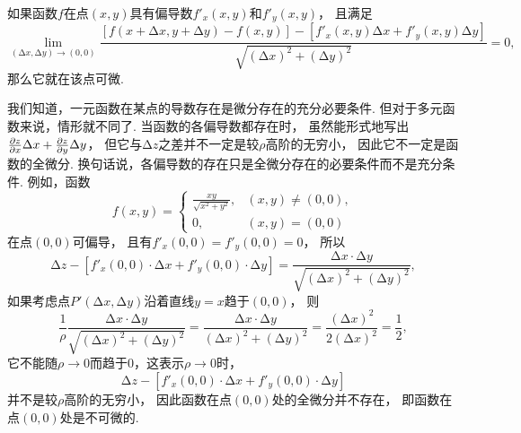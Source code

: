 \begin{theorem}\label{theorem:多元函数微分法.二元函数可微的充分必要条件}
如果函数\(f\)在点\((x,y)\)具有偏导数\(f'_x(x,y)\)和\(f'_y(x,y)\)，
且满足\[
	\lim_{(\increment x,\increment y)\to(0,0)}
	\frac{
		[f(x+\increment x,y+\increment y)-f(x,y)]
		-[f'_x(x,y) \increment x + f'_y(x,y) \increment y]
	}{
		\sqrt{(\increment x)^2+(\increment y)^2}
	} = 0,
\]那么它就在该点可微.
\end{theorem}

我们知道，一元函数在某点的导数存在是微分存在的充分必要条件.
但对于多元函数来说，情形就不同了.
当函数的各偏导数都存在时，
虽然能形式地写出\(\pdv{z}{x} \Delta x + \pdv{z}{y} \Delta y\)，
但它与\(\increment z\)之差并不一定是较\(\rho\)高阶的无穷小，
因此它不一定是函数的全微分.
换句话说，各偏导数的存在只是全微分存在的必要条件而不是充分条件.
例如，函数\[
	f(x,y) = \left\{ \begin{array}{cl}
		\frac{xy}{\sqrt{x^2+y^2}}, & (x,y)\neq(0,0), \\
		0, & (x,y)=(0,0)
	\end{array} \right.
\]在点\((0,0)\)可偏导，
且有\(f'_x(0,0) = f'_y(0,0) = 0\)，
所以\[
	\increment z - [f'_x(0,0) \cdot \increment x + f'_y(0,0) \cdot \increment y]
	= \frac{\increment x \cdot \increment y}{\sqrt{(\increment x)^2+(\increment y)^2}},
\]
如果考虑点\(P'(\increment x,\increment y)\)沿着直线\(y=x\)趋于\((0,0)\)，
则\[
	\frac{1}{\rho} \frac{\increment x \cdot \increment y}{\sqrt{(\increment x)^2+(\increment y)^2}}
	= \frac{\increment x \cdot \increment y}{(\increment x)^2+(\increment y)^2}
	= \frac{(\increment x)^2}{2(\increment x)^2}
	= \frac{1}{2},
\]
它不能随\(\rho\to0\)而趋于\(0\)，这表示\(\rho\to0\)时，\[
	\increment z - [f'_x(0,0) \cdot \increment x + f'_y(0,0) \cdot \increment y]
\]并不是较\(\rho\)高阶的无穷小，
因此函数在点\((0,0)\)处的全微分并不存在，
即函数在点\((0,0)\)处是不可微的.

